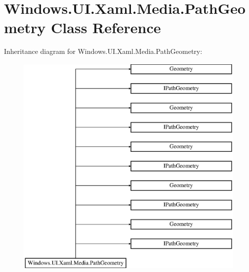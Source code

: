 \hypertarget{class_windows_1_1_u_i_1_1_xaml_1_1_media_1_1_path_geometry}{}\section{Windows.\+U\+I.\+Xaml.\+Media.\+Path\+Geometry Class Reference}
\label{class_windows_1_1_u_i_1_1_xaml_1_1_media_1_1_path_geometry}
Inheritance diagram for Windows.\+U\+I.\+Xaml.\+Media.\+Path\+Geometry\+:\begin{figure}[H]
\begin{center}
\leavevmode
\includegraphics[height=11.000000cm]{class_windows_1_1_u_i_1_1_xaml_1_1_media_1_1_path_geometry}
\end{center}
\end{figure}
